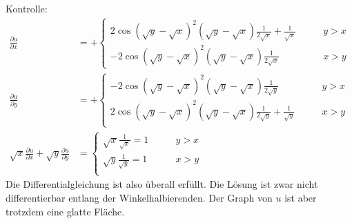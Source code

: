 \begin{loesung}
Kontrolle:
\begin{align*}
\frac{\partial u}{\partial x}
&=
+\begin{cases}
2\cos(\sqrt{y}-\sqrt{x})^2(\sqrt{y}-\sqrt{x})\frac1{2\sqrt{x}}
+\frac1{\sqrt{x}}&\qquad y> x\\
-2\cos(\sqrt{y}-\sqrt{x})^2(\sqrt{y}-\sqrt{x})\frac1{2\sqrt{x}}
&\qquad x> y
\end{cases}
\\
\frac{\partial u}{\partial y}
&=
+\begin{cases}
-2\cos(\sqrt{y}-\sqrt{x})^2(\sqrt{y}-\sqrt{x})\frac1{2\sqrt{y}}
&\qquad y> x\\
2\cos(\sqrt{y}-\sqrt{x})^2(\sqrt{y}-\sqrt{x})\frac1{2\sqrt{y}}
+\frac1{\sqrt{y}}&\qquad x> y\\
\end{cases}
\\
\sqrt{x}
\frac{\partial u}{\partial x}
+
\sqrt{y}
\frac{\partial u}{\partial y}
&=
\begin{cases}
\sqrt{x}\frac1{\sqrt{x}}=1&\qquad y> x\\
\sqrt{y}\frac1{\sqrt{y}}=1&\qquad x> y\\
\end{cases}
\end{align*}
Die Differentialgleichung ist also überall erfüllt. Die Lösung ist
zwar nicht differentierbar entlang der
Winkelhalbierenden. Der Graph von $u$ ist aber trotzdem eine
glatte Fläche.
\end{loesung}
